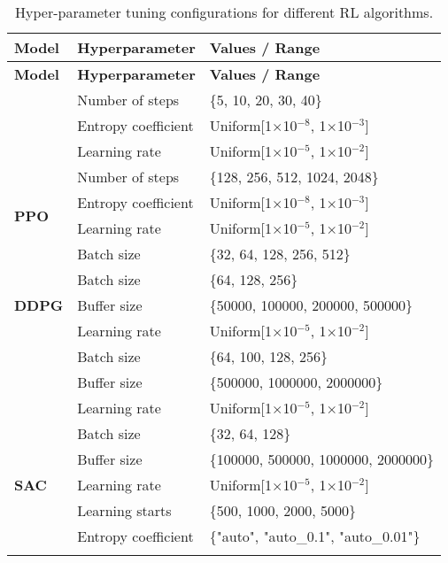 \begin{longtable}{|l|l|p{8cm}|}
    \hline
    \textbf{Model} & \textbf{Hyperparameter} & \textbf{Values / Range} \\ \midrule
    \endfirsthead

    \hline
    \textbf{Model} & \textbf{Hyperparameter} & \textbf{Values / Range} \\ \midrule
    \endhead

    \endfoot

    \multirow{3}{*}{\textbf{A2C}}
    & Number of steps & \{5, 10, 20, 30, 40\} \\
    & Entropy coefficient & Uniform[1$\times$10$^{-8}$, 1$\times$10$^{-3}$] \\ 
    & Learning rate & Uniform[1$\times$10$^{-5}$, 1$\times$10$^{-2}$] \\ \hline

    \multirow{4}{*}{\textbf{PPO}}
    & Number of steps & \{128, 256, 512, 1024, 2048\} \\ 
    & Entropy coefficient & Uniform[1$\times$10$^{-8}$, 1$\times$10$^{-3}$] \\ 
    & Learning rate & Uniform[1$\times$10$^{-5}$, 1$\times$10$^{-2}$] \\ 
    & Batch size & \{32, 64, 128, 256, 512\} \\ \hline

    \multirow{3}{*}{\textbf{DDPG}}
    & Batch size & \{64, 128, 256\} \\ 
    & Buffer size & \{50000, 100000, 200000, 500000\} \\ 
    & Learning rate & Uniform[1$\times$10$^{-5}$, 1$\times$10$^{-2}$] \\ \hline

    \pagebreak
    \multirow{3}{*}{\textbf{TD3}}
    & Batch size & \{64, 100, 128, 256\} \\ 
    & Buffer size & \{500000, 1000000, 2000000\} \\ 
    & Learning rate & Uniform[1$\times$10$^{-5}$, 1$\times$10$^{-2}$] \\ \hline

    \multirow{5}{*}{\textbf{SAC}}
    & Batch size & \{32, 64, 128\} \\ 
    & Buffer size & \{100000, 500000, 1000000, 2000000\} \\ 
    & Learning rate & Uniform[1$\times$10$^{-5}$, 1$\times$10$^{-2}$] \\ 
    & Learning starts & \{500, 1000, 2000, 5000\} \\ 
    & Entropy coefficient & \{"auto", "auto\_0.1", "auto\_0.01"\} \\ \hline
    \caption{Hyper-parameter tuning configurations for different RL algorithms.}
    \label{tab:model_hyperparameters}
\end{longtable}